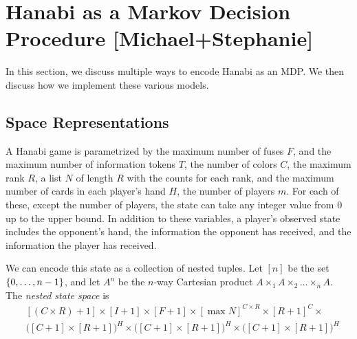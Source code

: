 \section{Hanabi as a Markov Decision Procedure [Michael+Stephanie]}\label{sec:hanabimdp}

In this section, we discuss multiple ways to encode Hanabi as an MDP. We then
discuss how we implement these various models.

\subsection{Space Representations}

A Hanabi game is parametrized by the maximum number of fuses $F$, and the
maximum number of information tokens $T$, the number of colors $C$, the maximum
rank $R$, a list $N$ of length $R$ with the counts for each rank, and the
maximum number of cards in each player's hand $H$, the number of players $m$.
For each of these, except the number of players, the state can take any integer
value from 0 up to the upper bound. In addition to these variables, a player's
observed state includes the opponent's hand, the information the opponent has
received, and the information the player has received.

We can encode this state as a collection of nested tuples. Let $[n]$ be the set
$\left\{0, \ldots, n-1\right\}$, and let $A^n$ be the $n$-way Cartesian product $A
\times_1 A \times_2 \ldots \times_n A$.
The \emph{nested state space} is 
\begin{align*}
    &[(C \times R) + 1] \times
  [I + 1] \times
  [F + 1] \times
  {[\max{N}]}^{C \times R}
  \times
  {[R + 1]}^{C} \times \\
    &{\bigl([C + 1] \times [R + 1]\bigr)}^{H}
  \times {\bigl([C + 1] \times [R + 1]\bigr)}^{H}
  \times {\bigl([C + 1] \times [R + 1]\bigr)}^{H}
\end{align*}

